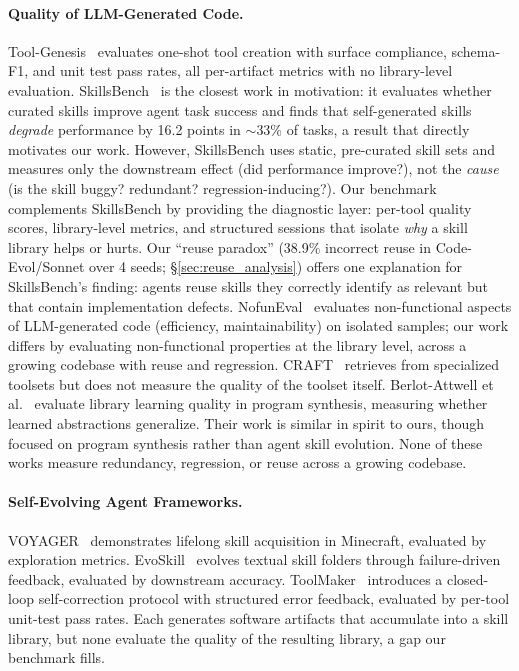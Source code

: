 \documentclass[sigconf,anonymous,review,natbib=false]{acmart}
\begin{document}
\paragraph{Quality of LLM-Generated Code.} Tool-Genesis~\cite{xia2026toolgenesis} evaluates one-shot tool creation with surface compliance, schema-F1, and unit test pass rates, all per-artifact metrics with no library-level evaluation. SkillsBench~\cite{skillsbench2026} is the closest work in motivation: it evaluates whether curated skills improve agent task success and finds that self-generated skills \emph{degrade} performance by 16.2 points in $\sim$33\% of tasks, a result that directly motivates our work. However, SkillsBench uses static, pre-curated skill sets and measures only the downstream effect (did performance improve?), not the \emph{cause} (is the skill buggy? redundant? regression-inducing?). Our benchmark complements SkillsBench by providing the diagnostic layer: per-tool quality scores, library-level metrics, and structured sessions that isolate \emph{why} a skill library helps or hurts. Our ``reuse paradox'' (38.9\% incorrect reuse in Code-Evol/Sonnet over 4 seeds; \S\ref{sec:reuse_analysis}) offers one explanation for SkillsBench's finding: agents reuse skills they correctly identify as relevant but that contain implementation defects. NofunEval~\cite{singhal2024nofuneval} evaluates non-functional aspects of LLM-generated code (efficiency, maintainability) on isolated samples; our work differs by evaluating non-functional properties at the library level, across a growing codebase with reuse and regression. CRAFT~\cite{yuan2023craft} retrieves from specialized toolsets but does not measure the quality of the toolset itself. Berlot-Attwell et al.~\cite{berlotattwell2026} evaluate library learning quality in program synthesis, measuring whether learned abstractions generalize. Their work is similar in spirit to ours, though focused on program synthesis rather than agent skill evolution. None of these works measure redundancy, regression, or reuse across a growing codebase.

\paragraph{Self-Evolving Agent Frameworks.} VOYAGER~\cite{wang2023voyager} demonstrates lifelong skill acquisition in Minecraft, evaluated by exploration metrics. EvoSkill~\cite{alzubi2026evoskill} evolves textual skill folders through failure-driven feedback, evaluated by downstream accuracy. ToolMaker~\cite{wolflein2025toolmaker} introduces a closed-loop self-correction protocol with structured error feedback, evaluated by per-tool unit-test pass rates. Each generates software artifacts that accumulate into a skill library, but none evaluate the quality of the resulting library, a gap our benchmark fills.
\end{document}
